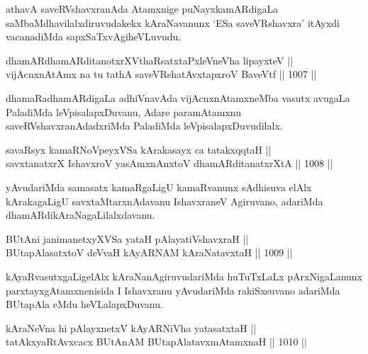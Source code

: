 \begin{artha}
athavA saveRVshavxranAda Atamxnige puNayxkamARdigaLa saMbaMdhavilalxdiruvudakekx kAraNavanunx `ESa saveVRshavxra' itAyxdi vacanadiMda sapxSaTxvAgiheVLuvudu.
\end{artha}


\begin{shl}
dhamARdhamARditanotxrXV\s thaRsatxtaPxleVneVha lipayxteV || \\
vijAcnxnAtAmx na tu tathA saveVRshatAvxtapxroV BaveVtf \hfill || 1007 ||  
\end{shl}

\begin{artha}
dhamaRadhamARdigaLa adhiVnavAda vijAcnxnAtamxneMba vasutx avugaLa PaladiMda leVpisalapxDuvanu, Adare paramAtamxnu saveRVshavxranAdadxriMda PaladiMda leVpisalapxDuvudilalx.
\end{artha}

\begin{shl}
savaRsyx kamaRNoV\s peyxVSa kArakasayx ca tatakxqqtaH || \\
savxtanatxrX IshavxroV yasAmxnAnxtoV dhamARditanatxrXtA \hfill || 1008 ||  
\end{shl}

\begin{artha}
yAvudariMda samasatx kamaRgaLigU kamaRvanunx sAdhisuva elAlx kArakagaLigU savxtaMtarxnAdavanu IshavxraneV Agiruvano, adariMda dhamARdikAraNagaLilalxdavanu.
\end{artha}

\begin{shl}
BUtAni janimanetxyXVSa yataH pAlayatiVshavxraH || \\
BUtapAlasatxtoV deVvaH kAyARNAM kAraNatavxtaH \hfill || 1009 ||  
\end{shl}

\begin{artha}
kAyaRvasutxgaLigelAlx kAraNanAgiruvudariMda huTuTxLaLx pArxNigaLanunx parxtayxgAtamxnenisida I Ishavxranu yAvudariMda rakiSxsuvano adariMda BUtapAla eMdu heVLalapxDuvanu.
\end{artha}


\begin{shl}
kAraNeVna hi pAlayxnetxV kAyARNiVha yatasatxtaH || \\
tatAkxyaRtAvxcacx BUtAnAM BUtapAlatavxmAtamxnaH \hfill || 1010 ||  
\end{shl}

